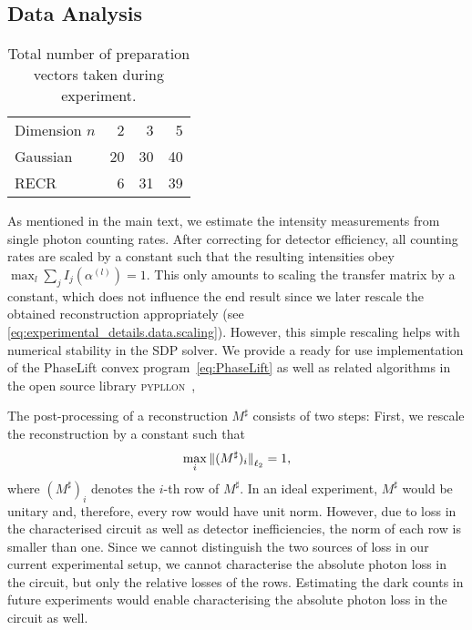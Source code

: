 \subsection{Data Analysis}%
\label{sub:experimental_details.data}

\begin{table}
  \begin{tabular}{l | r r r}
    Dimension $n$ & 2 & 3 & 5 \\
    Gaussian & 20 & 30 & 40 \\
    RECR & 6 & 31 & 39 \\
  \end{tabular}
  \caption{%
    \label{tab:measurements}
    Total number of preparation vectors taken during experiment.
  }
\end{table}

As mentioned in the main text, we estimate the intensity measurements from single photon counting rates.
After correcting for detector efficiency, all counting rates are scaled by a constant such that the resulting intensities obey $\max_l \sum_j I_j(\alpha^{(l)}) = 1$.
This only amounts to scaling the transfer matrix by a constant, which does not influence the end result since we later rescale the obtained reconstruction appropriately (see \cref{eq:experimental_details.data.scaling}).
However, this simple rescaling helps with numerical stability in the SDP solver.
We provide a ready for use implementation of the PhaseLift convex program~\eqref{eq:PhaseLift} as well as related algorithms in the open source library \textsc{pypllon}~\cite{Suess_2017_Pypllon},

The post-processing of a reconstruction ${M}^\sharp$ consists of two steps:
First, we rescale the reconstruction by a constant such that
\begin{equation}
  \label{eq:experimental_details.data.scaling}
  \max_i {\Vert(M^\sharp)_i\Vert}_{\ell_2} = 1,
\end{equation}
where $(M^\sharp)_i$ denotes the $i$-th row of $M^\sharp$.
In an ideal experiment, $M^\sharp$ would be unitary and, therefore, every row would have unit norm.
However, due to loss in the characterised circuit as well as detector inefficiencies, the norm of each row is smaller than one.
Since we cannot distinguish the two sources of loss in our current experimental setup, we cannot characterise the absolute photon loss in the circuit, but only the relative losses of the rows.
Estimating the dark counts in future experiments would enable characterising the absolute photon loss in the circuit as well.

